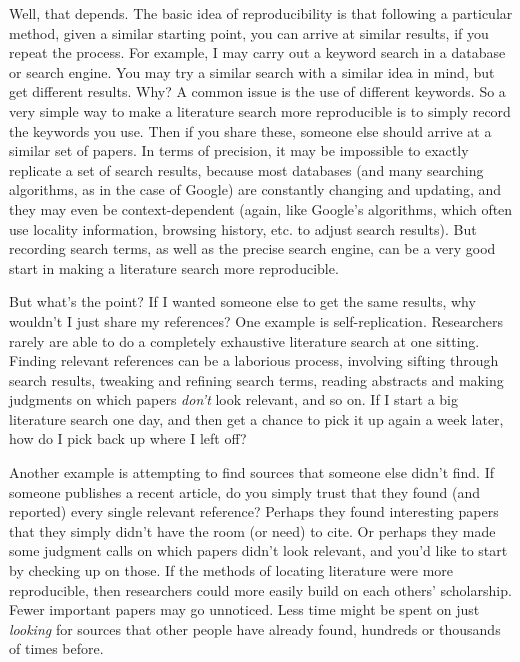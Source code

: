 \documentclass{book}
\begin{document}
Well, that depends. The basic idea of reproducibility is that following a particular method, given a similar starting point, you can arrive at similar results, if you repeat the process.  For example, I may carry out a keyword search in a database or search engine.  You may try a similar search with a similar idea in mind, but get different results. Why?  A common issue is the use of different keywords.  So a very simple way to make a literature search more reproducible is to simply record the keywords you use.  Then if you share these, someone else should arrive at a similar set of papers.  In terms of precision, it may be impossible to exactly replicate a set of search results, because most databases (and many searching algorithms, as in the case of Google) are constantly changing and updating, and they may even be context-dependent (again, like Google's algorithms, which often use locality information, browsing history, etc. to adjust search results).  But recording search terms, as well as the precise search engine, can be a very good start in making a literature search more reproducible.

But what's the point?  If I wanted someone else to get the same results, why wouldn't I just share my references?  One example is self-replication. Researchers rarely are able to do a completely exhaustive literature search at one sitting.  Finding relevant references can be a laborious process, involving sifting through search results, tweaking and refining search terms, reading abstracts and making judgments on which papers \emph{don't} look relevant, and so on.  If I start a big literature search one day, and then get a chance to pick it up again a week later, how do I pick back up where I left off?  

Another example is attempting to find sources that someone else didn't find.  If someone publishes a recent article, do you simply trust that they found (and reported) every single relevant reference?  Perhaps they found interesting papers that they simply didn't have the room (or need) to cite.  Or perhaps they made some judgment calls on which papers didn't look relevant, and you'd like to start by checking up on those.  If the methods of locating literature were more reproducible, then researchers could more easily build on each others' scholarship. Fewer important papers may go unnoticed. Less time might be spent on just \emph{looking} for sources that other people have already found, hundreds or thousands of times before.
\end{document}
